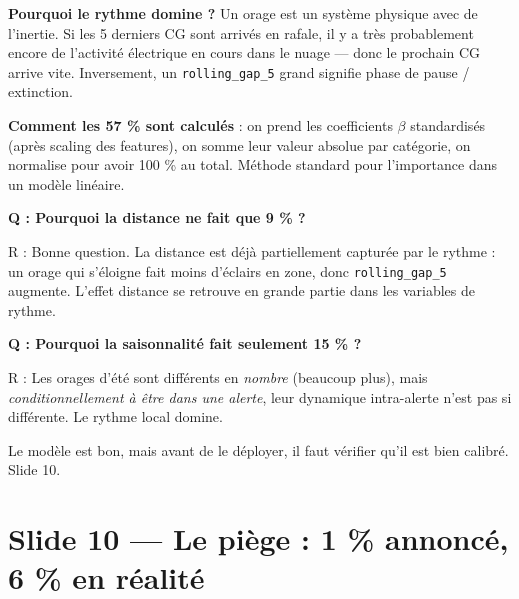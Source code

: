 \documentclass[11pt,a4paper]{article}
\begin{document}
\begin{compr}
\textbf{Pourquoi le rythme domine ?} Un orage est un système physique avec de l'inertie.
Si les 5 derniers CG sont arrivés en rafale, il y a très probablement encore de l'activité
électrique en cours dans le nuage — donc le prochain CG arrive vite. Inversement, un
\texttt{rolling\_gap\_5} grand signifie phase de pause / extinction.

\textbf{Comment les 57 \% sont calculés} : on prend les coefficients $\beta$ standardisés
(après scaling des features), on somme leur valeur absolue par catégorie, on normalise pour
avoir 100 \% au total. Méthode standard pour l'importance dans un modèle linéaire.
\end{compr}

\begin{piege}
\textbf{Q : Pourquoi la distance ne fait que 9 \% ?}

R : Bonne question. La distance est déjà partiellement capturée par le rythme : un orage
qui s'éloigne fait moins d'éclairs en zone, donc \texttt{rolling\_gap\_5} augmente. L'effet
\og distance \fg{} se retrouve en grande partie dans les variables de rythme.

\textbf{Q : Pourquoi la saisonnalité fait seulement 15 \% ?}

R : Les orages d'été sont différents en \emph{nombre} (beaucoup plus), mais
\emph{conditionnellement à être dans une alerte}, leur dynamique intra-alerte n'est pas si
différente. Le rythme local domine.
\end{piege}

\begin{transit}
\og Le modèle est bon, mais avant de le déployer, il faut vérifier qu'il est bien calibré.
Slide 10. \fg{}
\end{transit}

\section{Slide 10 — Le piège : 1 \% annoncé, 6 \% en réalité}
\end{document}
